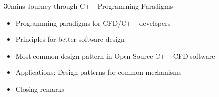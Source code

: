 \begin{frame}[fragile]{30mins Journey through C++ Programming Paradigms}

    \begin{itemize}
        \item Programming paradigms for CFD/C++ developers
        \item Principles for better software design
        \item Most common design pattern in Open Source C++ CFD software
        \item Applications: Design patterns for common mechanisms
        \item Closing remarks
    \end{itemize}

\end{frame}

